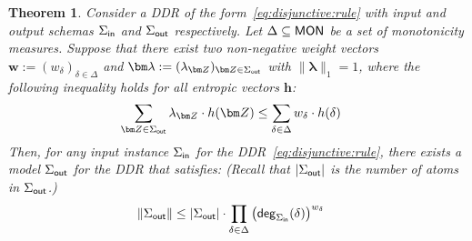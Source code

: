 \documentclass[10pt,a4paper]{article}
\newtheorem{theorem}{Theorem}[section]
\newcommand{\norm}[1]{\|#1\|}
\newcommand{\degree}{\text{\sf deg}}
\newcommand{\inn}{\text{\sf in}}
\newcommand{\out}{\text{\sf out}}
\newcommand{\mon}{\text{\sf MON}}
\begin{document}
\begin{theorem} \label{th:upper:bound}
Consider a DDR of the form~\eqref{eq:disjunctive:rule}
with input and output schemas $\Sigma_{\inn}$ and $\Sigma_{\out}$ respectively. Let
$\Delta\subseteq \mon$ be a set of monotonicity measures.
Suppose that there exist two {\em non-negative} weight vectors $\bm w := (w_\delta)_{\delta \in \Delta}$ and
$\bm \lambda := (\lambda_{\bm Z})_{\bm Z \in\Sigma_{\out}}$
with $\norm{\bm \lambda}_1=1$,
where the following inequality holds for all entropic vectors $\bm h$:
%
\begin{align}
    \sum_{\bm Z \in \Sigma_{\out}}\lambda_{\bm Z}\cdot h(\bm Z)
    & \leq \sum_{\delta \in \Delta} w_\delta \cdot h(\delta)\label{eqn:ddr:shearer}
\end{align}
  Then, for any input instance $\Sigma_{\inn}$ for the DDR~\eqref{eq:disjunctive:rule},
  there exists a model $\Sigma_{\out}$ for the DDR that satisfies: (Recall that $|\Sigma_\out|$ is the number of atoms in $\Sigma_\out$.)
  \begin{align}
    \norm{\Sigma_{\out}} &\leq
        |\Sigma_\out|\cdot
      \prod_{\delta \in \Delta} \left(\degree_{\Sigma_{\inn}}(\delta)\right)^{w_\delta}
      \label{eq:q:inequality}
  \end{align}
\end{theorem}
\end{document}
